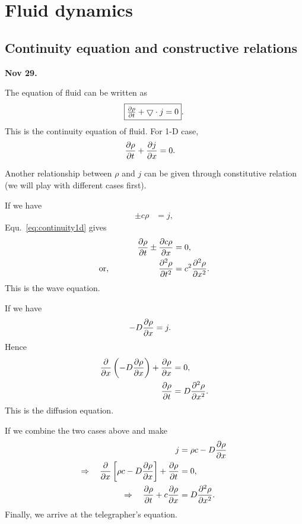 \chapter{Fluid dynamics}\label{chap:fluid}
\section{Continuity equation and constructive relations}

\textbf{Nov 29.}

The equation of fluid can be written as
\begin{align}
\fbox{$\frac{\partial {\rho}}{\partial t} + \bigtriangledown \cdot j =0$}.\label{eq:continuity3d}
\end{align}
This is the continuity equation of fluid. For 1-D case, 
\begin{align}
\frac{\partial {\rho}}{\partial t} + \frac{\partial {j}}{\partial x} &=0.\label{eq:continuity1d}
\end{align}


Another relationship between $ \rho $ and $ j $ can be given through constitutive relation (we will play with different cases first). 

If we have
\begin{align}
\pm c\rho &=j,
\end{align}
Equ.~\eqref{eq:continuity1d} gives 
\begin{align}
\frac{\partial {\rho }}{\partial t} \pm \frac{\partial {c\rho}}{\partial x} &=0,\\
\mathrm{or,}\qquad\qquad \qquad  \frac{\partial^2 {\rho}}{\partial t^2} &=c^2 \frac{\partial^2 {\rho}}{\partial x^2}.
\end{align}
This is the wave equation.

If we have
\begin{align}
-D \frac{\partial {\rho}}{\partial x} &=j.
\end{align}
Hence
\begin{align}
\frac{\partial}{\partial x} \left( -D\frac{\partial {\rho}}{\partial x} \right) + \frac{\partial {\rho}}{\partial x} &=0,\\
\frac{\partial {\rho}}{\partial t} &= D\frac{\partial^2 {\rho}}{\partial x^2}.
\end{align}
This is the diffusion equation. 

If we combine the two cases above and make
\begin{align}
j &=\rho c -D \frac{\partial {\rho}}{\partial x}\\
\Rightarrow \quad \frac{\partial }{\partial x} \left[ \rho c -D\frac{\partial {\rho }}{\partial x} \right] + \frac{\partial {\rho}}{\partial t} &=0,\\
\Rightarrow \quad \frac{\partial {\rho}}{\partial t} + c \frac{\partial {\rho }}{\partial x} &= D\frac{\partial^2 {\rho}}{\partial x^2}.
\end{align}
Finally, we arrive at the telegrapher's equation.

